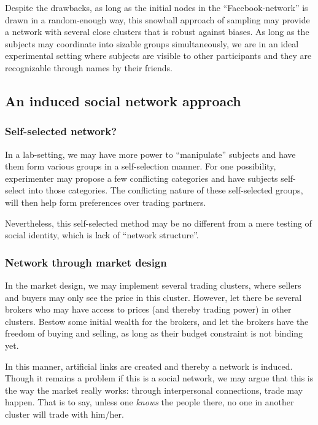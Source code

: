 \documentclass{article}
\begin{document}
Despite the drawbacks, as long as the initial nodes in the ``Facebook-network''
is drawn in a random-enough way, this snowball approach of sampling may provide
a network with several close clusters that is robust against biases.
As long as the subjects may coordinate into sizable groups simultaneously, we
are in an ideal experimental setting where subjects are visible to other
participants and they are recognizable through names by their friends.

\subsection{An induced social network approach}

\subsubsection{Self-selected network?}
In a lab-setting, we may have more power to ``manipulate'' subjects and have
them form various groups in a self-selection manner. For one possibility,
experimenter may propose a few conflicting categories and have subjects
self-select into those categories. The conflicting nature of these self-selected
groups, will then help form preferences over trading partners.

Nevertheless, this self-selected method may be no different from a mere testing
of social identity, which is lack of ``network structure''.

\subsubsection{Network through market design}

In the market design, we may implement several trading clusters, where sellers
and buyers may only see the price in this cluster. However, let there be several
brokers who may have access to prices (and thereby trading power) in other
clusters. Bestow some initial wealth for the brokers, and let the brokers have
the freedom of buying and selling, as long as their budget constraint is not
binding yet.

In this manner, artificial links are created and thereby a network is induced.
Though it remains a problem if this is a social network, we may argue that this
is the way the market really works: through interpersonal connections, trade may
happen. That is to say, unless one \textit{knows} the people there, no one in
another cluster will trade with him/her.
\end{document}
